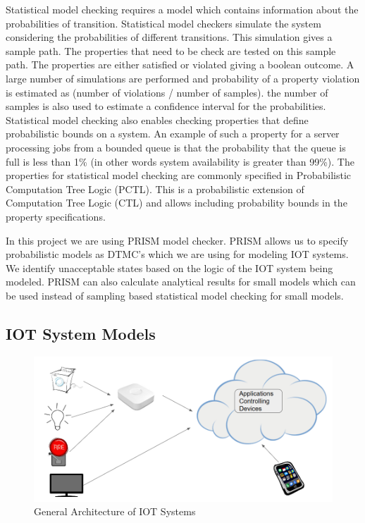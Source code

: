 Statistical model checking requires a model which contains information about the probabilities of transition. Statistical model checkers simulate the system considering the probabilities of different transitions. This simulation gives a sample path. The properties that need to be check are tested on this sample path. The properties are either satisfied or violated giving a boolean outcome. A large number of simulations are performed and probability of a property violation is estimated as (number of violations / number of samples). the number of samples is also used to estimate a confidence interval for the probabilities. Statistical model checking also enables checking properties that define probabilistic bounds on a system. An example of such a property for a server processing jobs from a bounded queue is that the probability that the queue is full is less than 1\% (in other words system availability is greater than 99\%). The properties for statistical model checking are commonly specified in Probabilistic Computation Tree Logic (PCTL). This is a probabilistic extension of Computation Tree Logic (CTL) and allows including probability bounds in the property specifications.

In this project we are using PRISM model checker. PRISM allows us to specify probabilistic models as DTMC's which we are using for modeling IOT systems. We identify unacceptable states based on the logic of the IOT system being modeled. PRISM can also calculate analytical results for small models which can be used instead of sampling based statistical model checking for small models.

\subsection{IOT System Models}

\begin{figure} 
  \includegraphics[width=\textwidth]{IOT.PNG}
  \caption{General Architecture of IOT Systems}
  \label{IOT}
\end{figure}

